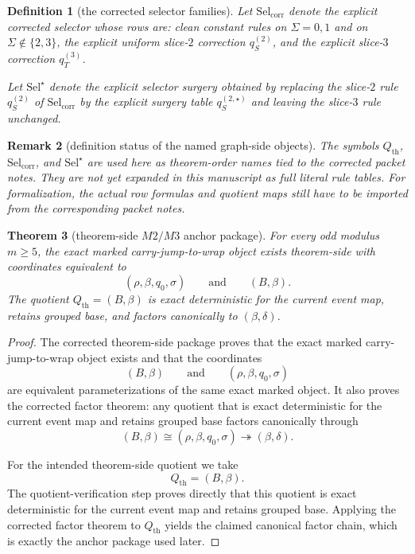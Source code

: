 \documentclass[11pt]{article}
\newtheorem{theorem}{Theorem}[section]
\newtheorem{remark}[theorem]{Remark}
\newtheorem{definition}[theorem]{Definition}
\newcommand{\SelCorr}{\mathrm{Sel}_{\mathrm{corr}}}
\newcommand{\SelStar}{\mathrm{Sel}^{\star}}
\begin{document}
\begin{definition}[the corrected selector families]
Let \(\SelCorr\) denote the explicit corrected selector whose rows are:
clean constant rules on \(\Sigma=0,1\) and on \(\Sigma\notin\{2,3\}\),
the explicit uniform slice-\(2\) correction \(q^{(2)}_S\),
and the explicit slice-\(3\) correction \(q^{(3)}_T\).

Let \(\SelStar\) denote the explicit selector surgery obtained by replacing the
slice-\(2\) rule \(q^{(2)}_S\) of \(\SelCorr\) by the explicit surgery table
\(q^{(2,\star)}_S\) and leaving the slice-\(3\) rule unchanged.
\end{definition}

\begin{remark}[definition status of the named graph-side objects]
The symbols \(Q_{\mathrm{th}}\), \(\SelCorr\), and \(\SelStar\) are used here
as theorem-order names tied to the corrected packet notes.
They are not yet expanded in this manuscript as full literal rule tables.
For formalization, the actual row formulas and quotient maps still have to be
imported from the corresponding packet notes.
\end{remark}

\begin{theorem}[theorem-side $M2/M3$ anchor package]
\label{thm:M23}
For every odd modulus $m\ge 5$, the exact marked carry-jump-to-wrap object
exists theorem-side with coordinates equivalent to
\[
(\rho,\beta,q_0,\sigma)
\qquad\text{and}\qquad
(B,\beta).
\]
The quotient \(Q_{\mathrm{th}}=(B,\beta)\) is exact deterministic for the
current event map, retains grouped base, and factors canonically to
\((\beta,\delta)\).
\end{theorem}

\begin{proof}
The corrected theorem-side package proves that the exact marked
carry-jump-to-wrap object exists and that the coordinates
\[
(B,\beta)
\qquad\text{and}\qquad
(\rho,\beta,q_0,\sigma)
\]
are equivalent parameterizations of the same exact marked object.
It also proves the corrected factor theorem: any quotient that is exact
deterministic for the current event map and retains grouped base factors
canonically through
\[
(B,\beta)\cong(\rho,\beta,q_0,\sigma)\twoheadrightarrow(\beta,\delta).
\]

For the intended theorem-side quotient we take
\[
Q_{\mathrm{th}}=(B,\beta).
\]
The quotient-verification step proves directly that this quotient is exact
deterministic for the current event map and retains grouped base.
Applying the corrected factor theorem to \(Q_{\mathrm{th}}\) yields the claimed
canonical factor chain, which is exactly the anchor package used later.
\end{proof}
\end{document}
